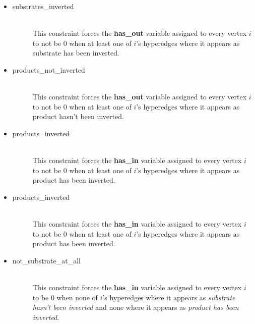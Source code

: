 \begin{enumerate}
\begin{itemize}
\begin{description}
        \end{description}        
        \item 
        \begin{description}
            \item[substrates\_inverted] ~\\
            This constraint forces the \textbf{has\_out} variable assigned to every vertex $i$ to not be 0 when at least one of $i$'s hyperedges where it appears as substrate has been inverted.
        \end{description}
        \item 
        \begin{description}
            \item[products\_not\_inverted] ~\\
            This constraint forces the \textbf{has\_out} variable assigned to every vertex $i$ to not be 0 when at least one of $i$'s hyperedges where it appears as product hasn't been inverted.
        \end{description}
        \item 
        \begin{description}
            \item[products\_inverted] ~\\
            This constraint forces the \textbf{has\_in} variable assigned to every vertex $i$ to not be 0 when at least one of $i$'s hyperedges where it appears as product has been inverted.
        \end{description}
        \item 
        \begin{description}
            \item[products\_inverted] ~\\
            This constraint forces the \textbf{has\_in} variable assigned to every vertex $i$ to not be 0 when at least one of $i$'s hyperedges where it appears as product has been inverted.
        \end{description}
        \item 
        \begin{description}
            \item[not\_substrate\_at\_all] ~\\
            This constraint forces the \textbf{has\_in} variable assigned to every vertex $i$ to be 0 when none of $i$'s hyperedges where it appears as \emph{substrate hasn't been inverted} and none where it appears as \emph{product has been inverted}.
        \end{description}

\end{itemize}
\end{enumerate}
